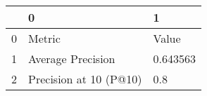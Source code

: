 \begin{tabular}{lll}
\toprule
{} &                       0 &         1 \\
\midrule
0 &                  Metric &     Value \\
1 &       Average Precision &  0.643563 \\
2 &  Precision at 10 (P@10) &       0.8 \\
\bottomrule
\end{tabular}
